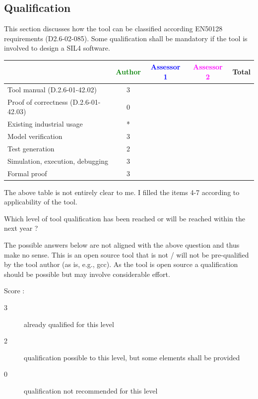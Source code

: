 \subsection{Qualification}

This section discusses how the tool can be classified according EN50128 requirements (D2.6-02-085). Some qualification shall be mandatory  if the tool is involved to design a SIL4 software.


\begin{tabular}{|l | c | c | c | c|}
\hline
& \textcolor{green}{Author} & \textcolor{blue}{Assessor 1} & \textcolor{magenta}{Assessor 2} & Total \\
\hline 
Tool manual (D.2.6-01-42.02) &3& & &  \\
\hline
Proof of correctness (D.2.6-01-42.03)   &0& & & \\
\hline
Existing industrial  usage  &*& & & \\
\hline
Model verification &3 & & & \\
\hline
Test generation &2& & & \\
\hline
Simulation, execution, debugging &3& & & \\
\hline
Formal proof &3& & & \\
\hline
\end{tabular}

\begin{author_comment}
The above table is not entirely clear to me. I filled the items 4-7 according to applicability of the tool.
\end{author_comment}

Which level of tool qualification has been reached or will be reached within the next year ?

\begin{author_comment}
The possible answers below are not aligned with the above question and thus make no sense. This is an open source tool that is not / will not be pre-qualified by the tool author (as is, e.g., gcc). As the tool is open source a qualification should be possible but may involve considerable effort.
\end{author_comment}


Score :
\begin{description}
\item[3] already qualified for this level
\item[2] qualification possible to this level, but some elements shall be provided
\item[0] qualification not recommended for this level
\end{description}



